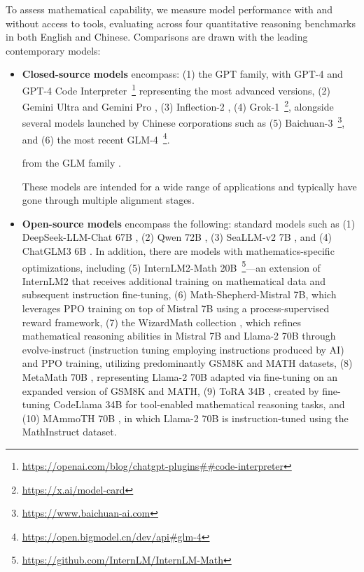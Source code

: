 \begin{itemize}[topsep=0pt]
To assess mathematical capability, we measure model performance with and without access to tools, evaluating across four quantitative reasoning benchmarks in both English and Chinese. Comparisons are drawn with the leading contemporary models:

\begin{itemize}[topsep=0pt]
    \item \textbf{Closed-source models} encompass: (1) the GPT family, with GPT-4 \citep{gpt4} and GPT-4 Code Interpreter~\footnote{\url{https://openai.com/blog/chatgpt-plugins\#\#code-interpreter}} representing the most advanced versions, (2) Gemini Ultra and Gemini Pro \citep{gemini}, (3) Inflection-2 \citep{inflection-2}, (4) Grok-1~\footnote{\url{https://x.ai/model-card}}, alongside several models launched by Chinese corporations such as (5) Baichuan-3~\footnote{\url{https://www.baichuan-ai.com}}, and (6) the most recent GLM-4~\footnote{\url{https://open.bigmodel.cn/dev/api\#glm-4}}.

    from the GLM family \citep{glm}.

These models are intended for a wide range of applications and typically have gone through multiple alignment stages.
    \item \textbf{Open-source models} encompass the following: standard models such as (1) DeepSeek-LLM-Chat 67B \citep{deepseek-llm}, (2) Qwen 72B \citep{qwen}, (3) SeaLLM-v2 7B \citep{seallm}, and (4) ChatGLM3 6B \citep{chatglm3}. In addition, there are models with mathematics-specific optimizations, including (5) InternLM2-Math 20B~\footnote{\url{https://github.com/InternLM/InternLM-Math}}—an extension of InternLM2 that receives additional training on mathematical data and subsequent instruction fine-tuning, (6) Math-Shepherd-Mistral 7B, which leverages PPO training \citep{schulman2017proximal} on top of Mistral 7B \citep{mistral} using a process-supervised reward framework, (7) the WizardMath collection \citep{wizardmath}, which refines mathematical reasoning abilities in Mistral 7B and Llama-2 70B \citep{llama2} through evolve-instruct (instruction tuning employing instructions produced by AI) and PPO training, utilizing predominantly GSM8K and MATH datasets, (8) MetaMath 70B \citep{metamath}, representing Llama-2 70B adapted via fine-tuning on an expanded version of GSM8K and MATH, (9) ToRA 34B \cite{tora}, created by fine-tuning CodeLlama 34B for tool-enabled mathematical reasoning tasks, and (10) MAmmoTH 70B \citep{MathInstruct}, in which Llama-2 70B is instruction-tuned using the MathInstruct dataset.


\end{itemize}
\end{itemize}

